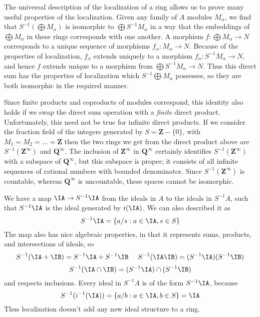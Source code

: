 The universal description of the localization of a ring allows us to prove many useful properties of the localization. Given any family of $A$ modules $M_\alpha$, we find that $S^{-1}(\bigoplus M_\alpha)$ is isomorphic to $\bigoplus S^{-1} M_\alpha$ in a way that the embeddings of $\bigoplus M_\alpha$ in these rings corresponds with one another. A morphism $f: \bigoplus M_\alpha \to N$ corresponds to a unique sequence of morphisms $f_\alpha: M_\alpha \to N$. Because of the properties of localization, $f_\alpha$ extends uniquely to a morphism $f_\alpha: S^{-1} M_\alpha \to N$, and hence $f$ extends unique to a morphism from $\bigoplus S^{-1} M_\alpha \to N$. Thus this direct sum has the properties of localization which $S^{-1} \bigoplus M_\alpha$ possesses, so they are both isomorphic in the required manner.

\begin{remark}
    Since finite products and coproducts of modules correspond, this identity also holds if we swap the direct sum operation with a {\it finite} direct product. Unfortunately, this need not be true for infinite direct products. If we consider the fraction field of the integers generated by $S = \mathbf{Z} - \{ 0 \}$, with $M_1 = M_2 = \dots = \mathbf{Z}$ then the two rings we get from the direct product above are $S^{-1}(\mathbf{Z}^\infty)$ and $\mathbf{Q}^\infty$. The inclusion of $\mathbf{Z}^\infty$ in $\mathbf{Q}^\infty$ certainly identifies $S^{-1}(\mathbf{Z}^\infty)$ with a subspace of $\mathbf{Q}^\infty$, but this subspace is proper; it consists of all infinite sequences of rational numbers with bounded denominator. Since $S^{-1}(\mathbf{Z}^\infty)$ is countable, whereas $\mathbf{Q}^\infty$ is uncountable, these spaces cannot be isomorphic.
\end{remark}

We have a map $\IA \to S^{-1}\IA$ from the ideals in $A$ to the ideals in $S^{-1}A$, such that $S^{-1}\IA$ is the ideal generated by $i(\IA)$. We can also described it as
%
\[ S^{-1}\IA = \{ a/s : a \in \IA, s \in S \} \]
%
The map also has nice algebraic properties, in that it represents sums, products, and intersections of ideals, so
%
\[ S^{-1}(\IA + \IB) = S^{-1}\IA + S^{-1}\IB\ \ \ \ S^{-1}(\IA \IB) = (S^{-1} \IA)(S^{-1}\IB) \]
\[ S^{-1}(\IA \cap \IB) = (S^{-1} \IA) \cap (S^{-1} \IB) \]
%
and respects inclusions. Every ideal in $S^{-1}A$ is of the form $S^{-1}\IA$, because
%
\[ S^{-1}(i^{-1}(\IA)) = \{ a/b : a \in \IA, b \in S \} = \IA \]
%
Thus localization doesn't add any new ideal structure to a ring.

